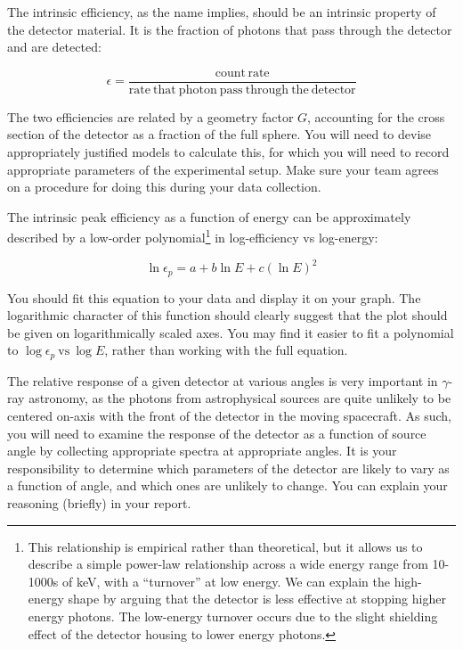 \documentclass{tufte-book}
\newcommand{\textgamma}{\ensuremath{\gamma}} %
\begin{document}
The intrinsic efficiency, as the name implies, should be an intrinsic property of the detector material. It is the fraction of photons that pass through the detector and are detected:

\begin{equation}
    \epsilon = \frac{\mathrm{count\,rate}}{\mathrm{rate~that~photon~pass~through~the~detector}}
\end{equation}

The two efficiencies are related by a geometry factor $G$, accounting for the cross section of the detector as a fraction of the full sphere. You will need to devise appropriately justified models to calculate this, for which you will need to record appropriate parameters of the experimental setup. Make sure your team agrees on a procedure for doing this during your data collection.

The intrinsic peak efficiency as a function of energy can be approximately described by a low-order polynomial\footnote{This relationship is empirical rather than theoretical, but it allows us to describe a simple power-law relationship across a wide energy range from 10-1000s of keV, with a ``turnover'' at low energy. We can explain the high-energy shape by arguing that the detector is less effective at stopping higher energy photons. The low-energy turnover occurs due to the slight shielding effect of the detector housing to lower energy photons.} in log-efficiency vs log-energy:

\begin{equation}
    \ln \epsilon_p = a + b \ln E + c (\ln E)^2
\end{equation}

\noindent You should fit this equation to your data and display it on your graph. The logarithmic character of this function should clearly suggest that the plot should be given on logarithmically scaled axes. You may find it easier to fit a polynomial to $\log \epsilon_p~\mathrm{vs}~\log E$, rather than working with the full equation.


The relative response of a given detector at various angles is very important in \textgamma-ray astronomy, as the photons from astrophysical sources are quite unlikely to be centered on-axis with the front of the detector in the moving spacecraft. As such, you will need to examine the response of the detector as a function of source angle by collecting appropriate spectra at appropriate angles. It is your responsibility to determine which parameters of the detector are likely to vary as a function of angle, and which ones are unlikely to change. You can explain your reasoning (briefly) in your report.
\end{document}
